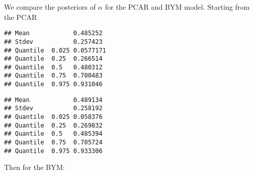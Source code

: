 \documentclass[
]{article}
\newenvironment{Shaded}{\begin{snugshade}}{\end{snugshade}}
\newcommand{\AttributeTok}[1]{\textcolor[rgb]{0.13,0.29,0.53}{#1}}
\newcommand{\CommentTok}[1]{\textcolor[rgb]{0.56,0.35,0.01}{\textit{#1}}}
\newcommand{\ControlFlowTok}[1]{\textcolor[rgb]{0.13,0.29,0.53}{\textbf{#1}}}
\newcommand{\DecValTok}[1]{\textcolor[rgb]{0.00,0.00,0.81}{#1}}
\newcommand{\FunctionTok}[1]{\textcolor[rgb]{0.13,0.29,0.53}{\textbf{#1}}}
\newcommand{\NormalTok}[1]{#1}
\newcommand{\SpecialCharTok}[1]{\textcolor[rgb]{0.81,0.36,0.00}{\textbf{#1}}}
\begin{document}
We compare the posteriors of \(\alpha\) for the PCAR and BYM model.
Starting from the PCAR

\begin{Shaded}
\end{Shaded}

\begin{verbatim}
## Mean            0.485252 
## Stdev           0.257423 
## Quantile  0.025 0.0577171 
## Quantile  0.25  0.266514 
## Quantile  0.5   0.480312 
## Quantile  0.75  0.700483 
## Quantile  0.975 0.931046
\end{verbatim}

\begin{Shaded}
\end{Shaded}

\begin{verbatim}
## Mean            0.489134 
## Stdev           0.258192 
## Quantile  0.025 0.058376 
## Quantile  0.25  0.269832 
## Quantile  0.5   0.485394 
## Quantile  0.75  0.705724 
## Quantile  0.975 0.933306
\end{verbatim}

Then for the BYM:

\begin{Shaded}
\end{Shaded}
\end{document}
